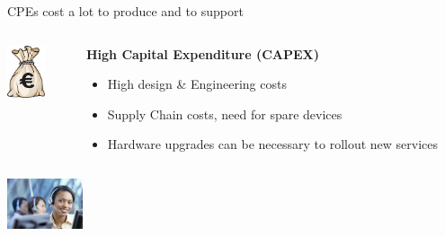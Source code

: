 \documentclass[a4paper]{beamer}
\begin{document}

\begin{frame}{CPEs cost a lot to produce and to support}
									
	\begin{columns}[T] 
		\begin{column}[T]{0.15 \textwidth} 
			\includegraphics[width=3em]{bagofmoney.jpg}
		\end{column}
																						
		\begin{column}[T]{0.75 \textwidth} %
																																	
																																		   
			\textbf{ High Capital Expenditure (CAPEX)}
			\begin{itemize}
				\item High design \& Engineering costs
				\item Supply Chain costs, need for spare devices
				\item Hardware upgrades can be necessary to rollout new services
			\end{itemize}
			\vspace{3em}				     
																																	
		\end{column}
																						
	\end{columns}
									
									
	\begin{columns}[T] 
		\begin{column}[T]{0.15 \textwidth} 
			\includegraphics[width=6em]{customer-care.jpg}
		\end{column}
																		
																						
		\begin{column}[T]{0.75 \textwidth} %
																																	

\end{column}
\end{columns}
\end{frame}
\end{document}

